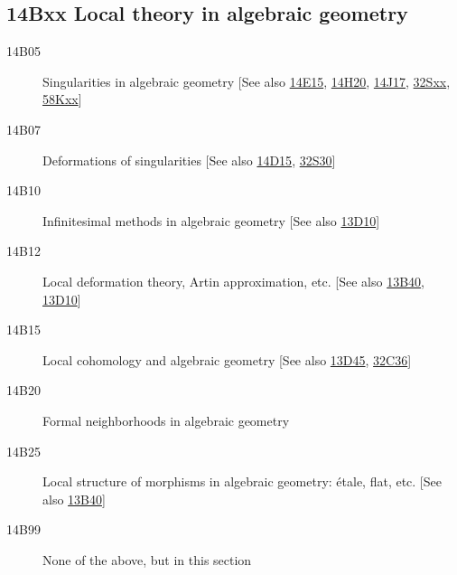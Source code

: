 \documentclass[letterpaper]{article}
\begin{document}
\subsection*{14Bxx Local theory in algebraic geometry }\label{14Bxx}
\begin{description}               
\item [14B05]\label{14B05} Singularities in algebraic geometry [See also \hyperref[14E15]{14E15}, \hyperref[14H20]{14H20}, \hyperref[14J17]{14J17}, \hyperref[32Sxx]{32Sxx}, \hyperref[58Kxx]{58Kxx}]
\item [14B07]\label{14B07} Deformations of singularities [See also \hyperref[14D15]{14D15}, \hyperref[32S30]{32S30}]
\item [14B10]\label{14B10} Infinitesimal methods in algebraic geometry [See also \hyperref[13D10]{13D10}]
\item [14B12]\label{14B12} Local deformation theory, Artin approximation, etc. [See also \hyperref[13B40]{13B40}, \hyperref[13D10]{13D10}]
\item [14B15]\label{14B15} Local cohomology and algebraic geometry [See also \hyperref[13D45]{13D45}, \hyperref[32C36]{32C36}]
\item [14B20]\label{14B20} Formal neighborhoods in algebraic geometry
\item [14B25]\label{14B25} Local structure of morphisms in algebraic geometry: \'{e}tale, flat, etc. [See also \hyperref[13B40]{13B40}]
\item [14B99]\label{14B99} None of the above, but in this section
\end{description}          
\end{document}
